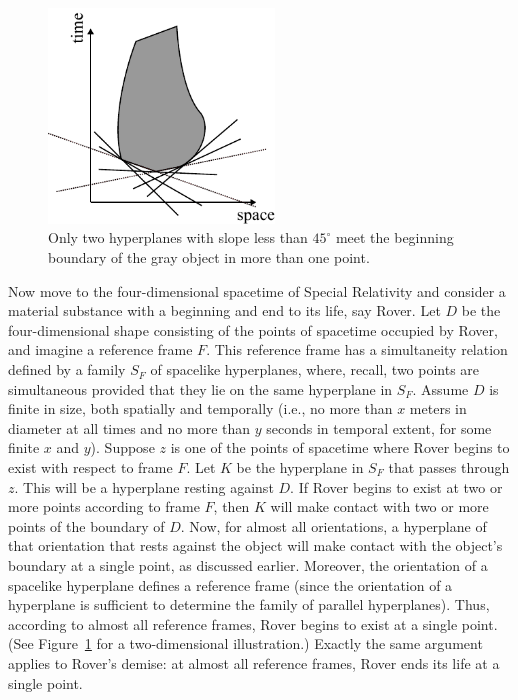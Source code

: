 \begin{figure}\label{fig:geometric}
\includegraphics[width=6cm]{geometric.pdf}
\caption{Only two hyperplanes with slope less than $45^\circ$ meet the beginning boundary of the gray object in more than one point.}
\end{figure}
Now move to the four-dimensional spacetime of Special Relativity and consider a material substance with a beginning and end to 
its life, say Rover. Let $D$ be the four-dimensional shape consisting of the points of spacetime occupied by Rover, and 
imagine a reference frame $F$. This reference frame has a simultaneity relation defined by a family $S_F$ of spacelike 
hyperplanes, where, recall, two points are simultaneous provided that they lie on the same hyperplane in $S_F$. Assume $D$ is 
finite in size, both spatially and temporally (i.e., no more than $x$ meters in diameter at all times and no more than $y$ seconds in temporal 
extent, for some finite $x$ and $y$). Suppose $z$ is one of the points of 
spacetime where Rover begins to exist with respect to frame $F$. Let $K$ be the hyperplane in $S_F$ that passes through 
$z$. This will be a hyperplane resting against $D$. If Rover begins to exist at two or more points according to frame $F$, 
then $K$ will make contact with two or more points of the boundary of $D$. Now, for almost all 
orientations, a hyperplane of that orientation that rests against the object will make contact with the object's boundary 
at a single point, as discussed earlier. Moreover, the orientation of a spacelike hyperplane defines a reference frame (since the
orientation of a hyperplane is sufficient to determine the family of parallel hyperplanes). Thus, according to almost all 
reference frames, Rover begins to exist at a single point. (See Figure~\ref{fig:geometric} for a two-dimensional
illustration.)
Exactly the same argument applies to Rover's demise: at almost all reference frames, Rover ends its life at a single point.


